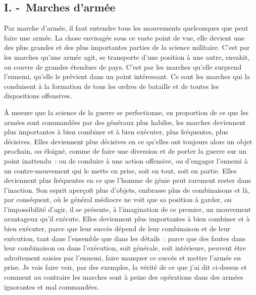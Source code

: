 \documentclass[french,twoside]{book} %
\begin{document}
\subsection[{I. - Marches d’armée}]{I. - Marches d’armée}
\noindent Par marche d’armée, il faut entendre tous les mouvements quelconques que peut faire une armée. La chose envisagée sous ce vaste point de vue, elle devient une des plus grandes et des plus importantes parties de la science militaire. C’est par les marches qu’une armée agit, se transporte d’une position à une autre, envahit, ou couvre de grandes étendues de pays. C’est par les marches qu’elle surprend l’ennemi, qu’elle le prévient dans un point intéressant. Ce sont les marches qui la conduisent à la formation de tous les ordres de bataille et de toutes les dispositions offensives.\par
À mesure que la science de la guerre se perfectionne, en proportion de ce que les armées sont commandées par des généraux plus habiles, les marches deviennent plus importantes à bien combiner et à bien exécuter, plus fréquentes, plus décisives. Elles deviennent plus décisives en ce qu’elles ont toujours alors un objet prochain, ou éloigné, comme de faire une diversion et de porter la guerre sur un point inattendu : ou de conduire à une action offensive, ou d’engager l’ennemi à un contre-mouvement qui le mette en prise, soit en tout, soit en partie. Elles deviennent plus fréquentes en ce que l’homme de génie peut rarement rester dans l’inaction. Son esprit aperçoit plus d’objets, embrasse plus de combinaisons et là, par conséquent, où le général médiocre ne voit que sa position à garder, ou l’impossibilité d’agir, il se présente, à l’imagination de ce premier, un mouvement avantageux qu’il exécute. Elles deviennent plus importantes à bien combiner et à bien exécuter, parce que leur succès dépend de leur combinaison et de leur exécution, tant dans l’ensemble que dans les détails : parce que des fautes dans leur combinaison ou dans l’exécution, soit générale, soit intérieure, peuvent être adroitement saisies par l’ennemi, faire manquer ce succès et mettre l’armée en prise. Je vais faire voir, par des exemples, la vérité de ce que j’ai dit ci-dessus et comment au contraire les marches sont à peine des opérations dans des armées ignorantes et mal commandées.\par
\end{document}
